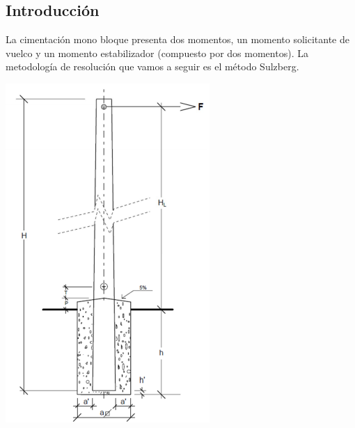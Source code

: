 \documentclass{article}
\begin{document}
    \subsection{Introducción}
    La cimentación mono bloque presenta dos momentos, un momento solicitante de vuelco y un momento estabilizador (compuesto por dos momentos). La metodología de resolución que vamos a seguir es el método Sulzberg.
    \begin{center}
    \includegraphics[scale = 1]{assets/img/Cimentacion Monobloque/cimentacion monobloque.png}
    \end{center}
    
    \newpage
\end{document}
